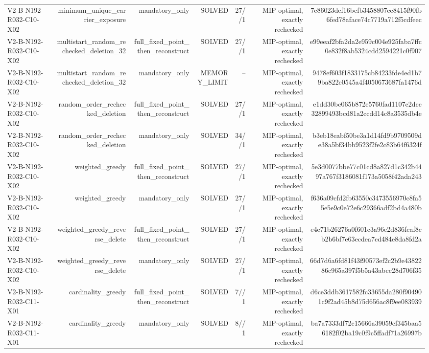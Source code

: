 {\begin{longtable}{lrrrrrr}
V2-B-N192-R032-C10-X02 & minimum\_unique\_carrier\_exposure & mandatory\_only & SOLVED & 27//1 & MIP-optimal, exactly rechecked & 7c86023def16bcfb3458807ce8415f90fb6fed78aface74c7719a712f5cdfeec \\
V2-B-N192-R032-C10-X02 & multistart\_random\_rechecked\_deletion\_32 & full\_fixed\_point\_then\_reconstruct & SOLVED & 27//1 & MIP-optimal, exactly rechecked & e99eeaf2bfa2da2e959c004e925faba7ffc0e832f8ab5324cdd2594221c0f907 \\
V2-B-N192-R032-C10-X02 & multistart\_random\_rechecked\_deletion\_32 & mandatory\_only & MEMORY\_LIMIT & -- & MIP-optimal, exactly rechecked & 9478ef603f1833175cb84233fde4ed1b79ba822e0545a4f4050673687fa1476d \\
V2-B-N192-R032-C10-X02 & random\_order\_rechecked\_deletion & full\_fixed\_point\_then\_reconstruct & SOLVED & 27//1 & MIP-optimal, exactly rechecked & e1dd30bc065b872e5760fad1107c2dcc32899493bcd81a2ccdd14c8a3535db4e \\
V2-B-N192-R032-C10-X02 & random\_order\_rechecked\_deletion & mandatory\_only & SOLVED & 34//1 & MIP-optimal, exactly rechecked & b3eb18eabf50be3a1d14fd9b9709509de38a5bf34bb9523f2fe2c83b64f6324f \\
V2-B-N192-R032-C10-X02 & weighted\_greedy & full\_fixed\_point\_then\_reconstruct & SOLVED & 27//1 & MIP-optimal, exactly rechecked & 5e3d0077bbe77c01cd8a827d1c342b4497a767f3186081f173a5058f42ada243 \\
V2-B-N192-R032-C10-X02 & weighted\_greedy & mandatory\_only & SOLVED & 27//1 & MIP-optimal, exactly rechecked & f636a09cfd2fb63550c3473556970c8fa55e5e9c0e72e6c29366adf2bd4a480b \\
V2-B-N192-R032-C10-X02 & weighted\_greedy\_reverse\_delete & full\_fixed\_point\_then\_reconstruct & SOLVED & 27//1 & MIP-optimal, exactly rechecked & e4e71b26276a0f601c3a96e2d836fcaf8cb2b6bf7e63ecdea7cd484e8da8fd2a \\
V2-B-N192-R032-C10-X02 & weighted\_greedy\_reverse\_delete & mandatory\_only & SOLVED & 27//1 & MIP-optimal, exactly rechecked & 66d7d6a6fd81f43f90573ef2c2b9e4382286c965a397f5b5a43abcc28d706f35 \\
V2-B-N192-R032-C11-X01 & cardinality\_greedy & full\_fixed\_point\_then\_reconstruct & SOLVED & 7//1 & MIP-optimal, exactly rechecked & d6ce3ddb3617582fc33655da280f904901c9f2ad45b8d75d656ac8f9ee083939 \\
V2-B-N192-R032-C11-X01 & cardinality\_greedy & mandatory\_only & SOLVED & 8//1 & MIP-optimal, exactly rechecked & ba7a7333df72c15666a39059cf345baa56182f02ba19c0f9c5ffadf71a26997b \\

\end{longtable}}
